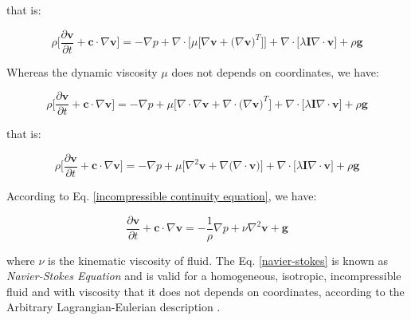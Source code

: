 \medskip
\noindent
that is:

\begin{equation} 
 \rho \Bigg[ \frac{\partial \textbf{v}}{\partial t} + \textbf{c} \cdot \nabla \textbf{v} \Bigg]
 =
 -
 \nabla p
 +
 \nabla \cdot \big[ \mu \big[ \nabla \textbf{v} + \big( \nabla \textbf{v} \big)^{T} \big] \big]
 + 
 \nabla \cdot \big[ \lambda \textbf{I} \nabla \cdot \textbf{v} \big]
 +
 \rho \textbf{g}
\end{equation}


\medskip
\noindent
Whereas the dynamic viscosity $\mu$ does not depends on coordinates,
we have:

\begin{equation} 
 \rho \Bigg[ \frac{\partial \textbf{v}}{\partial t} + \textbf{c} \cdot \nabla \textbf{v} \Bigg]
 =
 -
 \nabla p
 +
 \mu \big[ \nabla \cdot \nabla \textbf{v} + \nabla \cdot \big( \nabla \textbf{v} \big)^{T} \big]
 +
 \nabla \cdot \big[ \lambda \textbf{I} \nabla \cdot \textbf{v} \big]
 +
 \rho \textbf{g}
\end{equation}

\medskip
\noindent
that is:

\begin{equation} 
 \rho \Bigg[ \frac{\partial \textbf{v}}{\partial t} + \textbf{c} \cdot \nabla \textbf{v} \Bigg]
 =
 -
 \nabla p
 +
 \mu \big[ \nabla^{2} \textbf{v} + \nabla \big( \nabla \cdot \textbf{v} \big) \big]
 +
 \nabla \cdot \big[ \lambda \textbf{I} \nabla \cdot \textbf{v} \big]
 +
 \rho \textbf{g}
\end{equation}

\medskip
\noindent
According to Eq. \ref{incompressible continuity equation}, we have:

\begin{equation} \label{navier-stokes}
 \frac{\partial \textbf{v}}{\partial t} + \textbf{c} \cdot \nabla \textbf{v}
 =
 -
 \frac{1}{\rho} \nabla p
 +
 \nu \nabla^{2} \textbf{v}
 +
 \textbf{g}
\end{equation}

\medskip
\noindent
where $\nu$ is the kinematic viscosity of fluid.
 The Eq. \ref{navier-stokes} is known as
\textit{Navier-Stokes Equation} and is valid for a
homogeneous, isotropic, incompressible fluid
and with viscosity that it does not depends on coordinates,
according to the Arbitrary Lagrangian-Eulerian description
\cite{donea1982}.

\newpage
